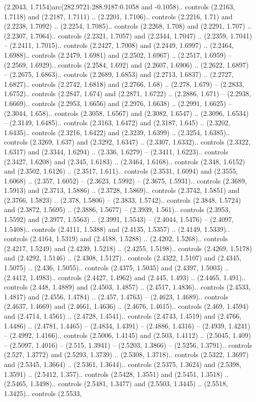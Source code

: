 (2.2043, 1.7154)arc(282.9721:288.9187:0.1058 and -0.1058).. controls (2.2163, 1.7118) and (2.2187, 1.7111) .. (2.2201, 1.7106).. controls (2.2216, 1.71) and (2.2238, 1.7092) .. (2.2254, 1.7085).. controls (2.2268, 1.708) and (2.2291, 1.707) .. (2.2307, 1.7064).. controls (2.2321, 1.7057) and (2.2344, 1.7047) .. (2.2359, 1.7041) -- (2.2411, 1.7015).. controls (2.2427, 1.7008) and (2.2449, 1.6997) .. (2.2464, 1.6988).. controls (2.2479, 1.6981) and (2.2502, 1.6967) .. (2.2517, 1.6959) -- (2.2569, 1.6929).. controls (2.2584, 1.692) and (2.2607, 1.6906) .. (2.2622, 1.6897) -- (2.2675, 1.6863).. controls (2.2689, 1.6853) and (2.2713, 1.6837) .. (2.2727, 1.6827).. controls (2.2742, 1.6818) and (2.2766, 1.68) .. (2.278, 1.679) -- (2.2833, 1.6752).. controls (2.2847, 1.674) and (2.2871, 1.6722) .. (2.2886, 1.671) -- (2.2938, 1.6669).. controls (2.2953, 1.6656) and (2.2976, 1.6638) .. (2.2991, 1.6625) -- (2.3044, 1.658).. controls (2.3058, 1.6567) and (2.3082, 1.6547) .. (2.3096, 1.6534) -- (2.3149, 1.6485).. controls (2.3163, 1.6472) and (2.3187, 1.645) .. (2.3202, 1.6435).. controls (2.3216, 1.6422) and (2.3239, 1.6399) .. (2.3254, 1.6385).. controls (2.3269, 1.637) and (2.3292, 1.6347) .. (2.3307, 1.6332).. controls (2.3322, 1.6317) and (2.3344, 1.6294) .. (2.336, 1.6279) -- (2.3411, 1.6223).. controls (2.3427, 1.6208) and (2.345, 1.6183) .. (2.3464, 1.6168).. controls (2.348, 1.6152) and (2.3502, 1.6126) .. (2.3517, 1.611).. controls (2.3531, 1.6094) and (2.3555, 1.6068) .. (2.357, 1.6052) -- (2.3623, 1.5992) -- (2.3675, 1.5931).. controls (2.3689, 1.5913) and (2.3713, 1.5886) .. (2.3728, 1.5869).. controls (2.3742, 1.5851) and (2.3766, 1.5823) .. (2.378, 1.5806) -- (2.3833, 1.5742).. controls (2.3848, 1.5724) and (2.3872, 1.5695) .. (2.3886, 1.5677) -- (2.3939, 1.561).. controls (2.3953, 1.5592) and (2.3977, 1.5563) .. (2.3991, 1.5543) -- (2.4044, 1.5476) -- (2.4097, 1.5408).. controls (2.4111, 1.5388) and (2.4135, 1.5357) .. (2.4149, 1.5339).. controls (2.4164, 1.5319) and (2.4188, 1.5288) .. (2.4202, 1.5268).. controls (2.4217, 1.5249) and (2.4239, 1.5218) .. (2.4255, 1.5198).. controls (2.4269, 1.5178) and (2.4292, 1.5146) .. (2.4308, 1.5127).. controls (2.4322, 1.5107) and (2.4345, 1.5075) .. (2.436, 1.5055).. controls (2.4375, 1.5035) and (2.4397, 1.5003) .. (2.4412, 1.4983).. controls (2.4427, 1.4962) and (2.445, 1.493) .. (2.4465, 1.491).. controls (2.448, 1.4889) and (2.4503, 1.4857) .. (2.4517, 1.4836).. controls (2.4533, 1.4817) and (2.4556, 1.4784) .. (2.457, 1.4763) -- (2.4623, 1.4689).. controls (2.4637, 1.4669) and (2.4661, 1.4636) .. (2.4676, 1.4615).. controls (2.469, 1.4594) and (2.4714, 1.4561) .. (2.4728, 1.4541).. controls (2.4743, 1.4519) and (2.4766, 1.4486) .. (2.4781, 1.4465) -- (2.4834, 1.4391) -- (2.4886, 1.4316) -- (2.4939, 1.4241) -- (2.4992, 1.4166).. controls (2.5006, 1.4145) and (2.503, 1.4112) .. (2.5045, 1.409) -- (2.5097, 1.4016) -- (2.515, 1.3941) -- (2.5203, 1.3866) -- (2.5256, 1.3791).. controls (2.527, 1.3772) and (2.5293, 1.3739) .. (2.5308, 1.3718).. controls (2.5322, 1.3697) and (2.5345, 1.3664) .. (2.5361, 1.3644).. controls (2.5375, 1.3624) and (2.5398, 1.3591) .. (2.5412, 1.357).. controls (2.5428, 1.3551) and (2.5451, 1.3518) .. (2.5465, 1.3498).. controls (2.5481, 1.3477) and (2.5503, 1.3445) .. (2.5518, 1.3425).. controls (2.5533, 